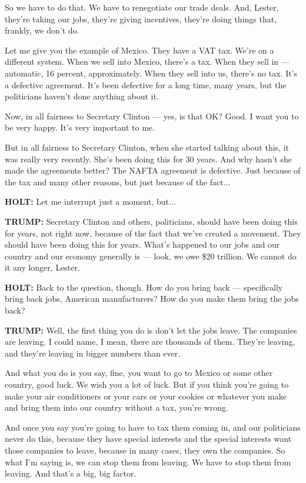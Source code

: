 So we have to do that. We have to renegotiate our trade deals. And,
Lester, they're taking our jobs, they're giving incentives, they're
doing things that, frankly, we don't do.

Let me give you the example of Mexico. They have a VAT tax. We're on a
different system. When we sell into Mexico, there's a tax. When they
sell in --- automatic, 16 percent, approximately. When they sell into
us, there's no tax. It's a defective agreement. It's been defective for
a long time, many years, but the politicians haven't done anything about
it.

Now, in all fairness to Secretary Clinton --- yes, is that OK? Good. I
want you to be very happy. It's very important to me.

But in all fairness to Secretary Clinton, when she started talking about
this, it was really very recently. She's been doing this for 30 years.
And why hasn't she made the agreements better? The NAFTA agreement is
defective. Just because of the tax and many other reasons, but just
because of the fact...

\textbf{HOLT:} Let me interrupt just a moment, but...

\textbf{TRUMP:} Secretary Clinton and others, politicians, should have
been doing this for years, not right now, because of the fact that we've
created a movement. They should have been doing this for years. What's
happened to our jobs and our country and our economy generally is ---
look, we owe \$20 trillion. We cannot do it any longer, Lester.

\textbf{HOLT:} Back to the question, though. How do you bring back ---
specifically bring back jobs, American manufacturers? How do you make
them bring the jobs back?

\textbf{TRUMP:} Well, the first thing you do is don't let the jobs
leave. The companies are leaving. I could name, I mean, there are
thousands of them. They're leaving, and they're leaving in bigger
numbers than ever.

And what you do is you say, fine, you want to go to Mexico or some other
country, good luck. We wish you a lot of luck. But if you think you're
going to make your air conditioners or your cars or your cookies or
whatever you make and bring them into our country without a tax, you're
wrong.

And once you say you're going to have to tax them coming in, and our
politicians never do this, because they have special interests and the
special interests want those companies to leave, because in many cases,
they own the companies. So what I'm saying is, we can stop them from
leaving. We have to stop them from leaving. And that's a big, big
factor.

